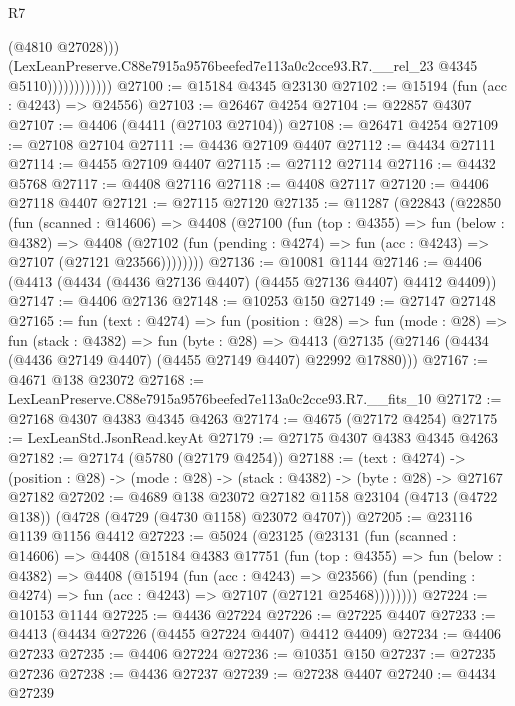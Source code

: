 \begin{lexlean}{R7}
\begin{coremodule}
                              (@4810 @27028)))
                          (LexLeanPreserve.C88e7915a9576beefed7e113a0c2cce93.R7.__rel_23
                            @4345
                            @5110))))))))))))
@27100 := @15184 @4345 @23130
@27102 := @15194 (fun (acc : @4243) => @24556)
@27103 := @26467 @4254
@27104 := @22857 @4307
@27107 := @4406 (@4411 (@27103 @27104))
@27108 := @26471 @4254
@27109 := @27108 @27104
@27111 := @4436 @27109 @4407
@27112 := @4434 @27111
@27114 := @4455 @27109 @4407
@27115 := @27112 @27114
@27116 := @4432 @5768
@27117 := @4408 @27116
@27118 := @4408 @27117
@27120 := @4406 @27118 @4407
@27121 := @27115 @27120
@27135 := @11287
    (@22843
      (@22850
        (fun (scanned : @14606) =>
        @4408
          (@27100
            (fun (top : @4355) =>
            fun (below : @4382) =>
            @4408
              (@27102 (fun (pending : @4274) => fun (acc : @4243) => @27107 (@27121 @23566))))))))
@27136 := @10081 @1144
@27146 := @4406 (@4413 (@4434 (@4436 @27136 @4407) (@4455 @27136 @4407) @4412 @4409))
@27147 := @4406 @27136
@27148 := @10253 @150
@27149 := @27147 @27148
@27165 := fun (text : @4274) =>
  fun (position : @28) =>
  fun (mode : @28) =>
  fun (stack : @4382) =>
  fun (byte : @28) =>
  @4413 (@27135 (@27146 (@4434 (@4436 @27149 @4407) (@4455 @27149 @4407) @22992 @17880)))
@27167 := @4671 @138 @23072
@27168 := LexLeanPreserve.C88e7915a9576beefed7e113a0c2cce93.R7.__fits_10
@27172 := @27168 @4307 @4383 @4345 @4263
@27174 := @4675 (@27172 @4254)
@27175 := LexLeanStd.JsonRead.keyAt
@27179 := @27175 @4307 @4383 @4345 @4263
@27182 := @27174 (@5780 (@27179 @4254))
@27188 := (text : @4274) ->
  (position : @28) -> (mode : @28) -> (stack : @4382) -> (byte : @28) -> @27167 @27182
@27202 := @4689
    @138
    @23072
    @27182
    @1158
    @23104
    (@4713 (@4722 @138))
    (@4728 (@4729 (@4730 @1158) @23072 @4707))
@27205 := @23116 @1139 @1156 @4412
@27223 := @5024
    (@23125
      (@23131
        (fun (scanned : @14606) =>
        @4408
          (@15184
            @4383
            @17751
            (fun (top : @4355) =>
            fun (below : @4382) =>
            @4408
              (@15194
                (fun (acc : @4243) => @23566)
                (fun (pending : @4274) => fun (acc : @4243) => @27107 (@27121 @25468))))))))
@27224 := @10153 @1144
@27225 := @4436 @27224
@27226 := @27225 @4407
@27233 := @4413 (@4434 @27226 (@4455 @27224 @4407) @4412 @4409)
@27234 := @4406 @27233
@27235 := @4406 @27224
@27236 := @10351 @150
@27237 := @27235 @27236
@27238 := @4436 @27237
@27239 := @27238 @4407
@27240 := @4434 @27239

\end{coremodule}
\end{lexlean}
